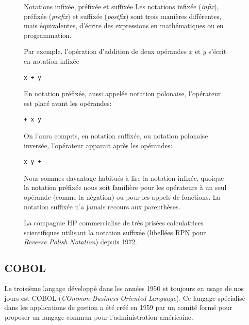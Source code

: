 \begin{figure}[t]
  \label{fig:informatique:notations}
  \setlength{\FrameRule}{1pt}
  \begin{emphbox}{\mdseries Notations infixée, préfixée et suffixée}
    Les notations infixée (\emph{infix}),
    préfixée (\emph{prefix}) et
    suffixée (\emph{postfix}) sont trois
    manières différentes, mais équivalentes, d'écrire des expressions
    en mathématiques ou en programmation.

    Par exemple, l'opération d'addition de deux opérandes $x$ et $y$
    s'écrit en notation infixée
\begin{lstlisting}
x + y
\end{lstlisting}
    En notation préfixée, aussi appelée notation polonaise,
    l'opérateur est placé avant les opérandes:
\begin{lstlisting}
+ x y
\end{lstlisting}
    On l'aura compris, en notation suffixée, ou notation polonaise
    inversée, l'opérateur apparait après les opérandes:
\begin{lstlisting}
x y +
\end{lstlisting}
    Nous sommes davantage habitués à lire la notation infixée, quoique
    la notation préfixée nous soit familière pour les opérateurs à un
    seul opérande (comme la négation) ou pour les appels de fonctions.
    La notation suffixée n'a jamais recours aux parenthèses.

    La compagnie HP commercialise de très prisées calculatrices
    scientifiques utilisant la notation suffixée (libellées RPN pour
    \emph{Reverse Polish Notation}) depuis 1972.
  \end{emphbox}
\end{figure}

\subsection{COBOL}
\label{sec:informatique:historique:cobol}

Le troisième langage développé dans les années 1950 et toujours en
usage de nos jours est COBOL (\emph{COmmon Business
  Oriented Language}). Ce langage spécialisé dans les applications de
gestion a été créé en 1959 par un comité formé pour proposer un
langage commun pour l'administration américaine.

